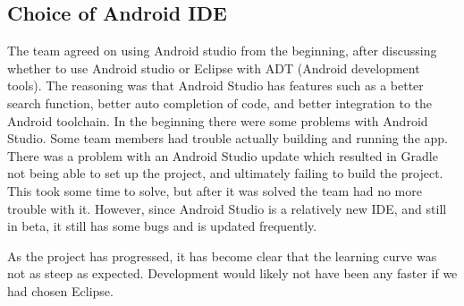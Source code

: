 \subsection{Choice of Android IDE}
The team agreed on using Android studio from the beginning, after discussing whether to use Android studio or Eclipse with ADT (Android development tools). The reasoning was that Android Studio has features such as a better search function, better auto completion of code, and better integration to the Android toolchain. In the beginning there were some problems with Android Studio. Some team members had trouble actually building and running the app. There was a problem with an Android Studio update which resulted in Gradle not being able to set up the project, and ultimately failing to build the project. This took some time to solve, but after it was solved the team had no more trouble with it. However, since Android Studio is a relatively new IDE, and still in beta, it still has some bugs and is updated frequently.

As the project has progressed, it has become clear that the learning curve was not as steep as expected. Development would likely not have been any faster if we had chosen Eclipse.

